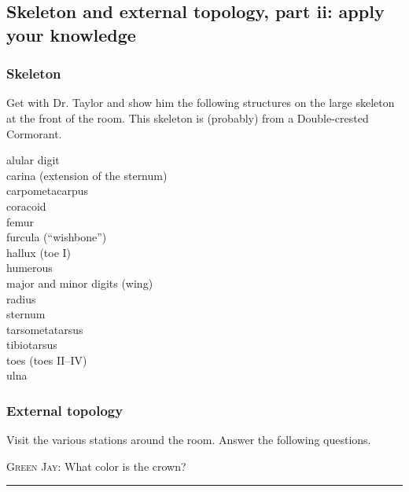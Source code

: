 \documentclass[10pt]{article}
\newcommand{\blankline}{\rule{2in}{0.4pt}}
\begin{document}
\thispagestyle{plain}

\subsection*{Skeleton and external topology, part ii: apply your knowledge}

\subsubsection*{Skeleton}

	Get with Dr. Taylor and show him the following structures on the large skeleton at the front of the room. This skeleton is (probably) from a Double-crested Cormorant.

\begin{multicols}{3}
	alular digit\\
	carina (extension of the sternum)\\
	carpometacarpus\\
	coracoid\\
	femur\\
	furcula (“wishbone”)\\
	hallux (toe I)\\
	humerous\\
	major and minor digits (wing)\\
	radius\\
	sternum\\
	tarsometatarsus\\
	tibiotarsus\\
	toes (toes II–IV)\\
	ulna
\end{multicols}

\subsubsection*{External topology}

Visit the various stations around the room. Answer the following questions.


\medskip

\textsc{Green Jay:} What color is the crown? \blankline

\bigskip
\end{document}
